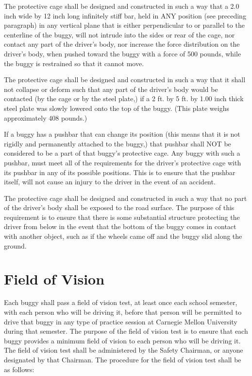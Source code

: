 	The protective cage shall be designed and constructed in such a way that a 2.0
	inch wide by 12 inch long infinitely stiff bar, held in ANY position (see
	preceding paragraph) in any vertical plane that is either perpendicular to or
	parallel to the centerline of the buggy, will not intrude into the sides or
	rear of the cage, nor contact any part of the driver's body, nor increase the
	force distribution on the driver's body, when pushed toward the buggy with a
	force of 500 pounds, while the buggy is restrained so that it cannot move.

	The protective cage shall be designed and constructed in such a way that it
	shall not collapse or deform such that any part of the driver's body would be
	contacted (by the cage or by the steel plate,) if a 2 ft. by 5 ft. by 1.00 inch
	thick steel plate was slowly lowered onto the top of the buggy. (This plate
	weighs approximately 408 pounds.)

	If a buggy has a pushbar that can change its position (this means that it is
	not rigidly and permanently attached to the buggy,) that pushbar shall NOT be
	considered to be a part of that buggy's protective cage. Any buggy with such a
	pushbar, must meet all of the requirements for the driver's protective cage
	with its pushbar in any of its possible positions. This is to ensure that the
	pushbar itself, will not cause an injury to the driver in the event of an
	accident.

	The protective cage shall be designed and constructed in such a way that no
	part of the driver's body shall be exposed to the road surface. The purpose of
	this requirement is to ensure that there is some substantial structure
	protecting the driver from below in the event that the bottom of the buggy
	comes in contact with another object, such as if the wheels came off and the
	buggy slid along the ground.

\section{Field of Vision}

	Each buggy shall pass a field of vision test, at least once each school
	semester, with each person who will be driving it, before that person will be
	permitted to drive that buggy in any type of practice session at Carnegie
	Mellon University during that semester. The purpose of the field of vision test
	is to ensure that each buggy provides a minimum field of vision to each person
	who will be driving it. The field of vision test shall be administered by the
	Safety Chairman, or anyone designated by that Chairman. The procedure for the
	field of vision test shall be as follows:
	\newline

